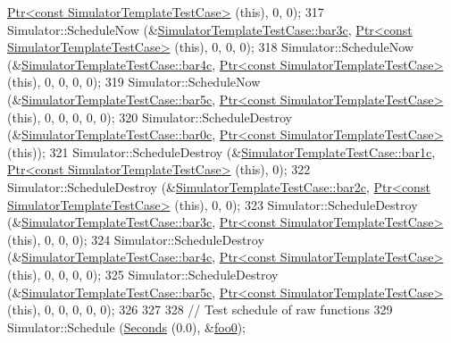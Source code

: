\begin{DoxyCode}
      \hyperlink{classns3_1_1Ptr}{Ptr<const SimulatorTemplateTestCase>} (\textcolor{keyword}{this}), 0, 0);
317   Simulator::ScheduleNow (&\hyperlink{classSimulatorTemplateTestCase_a3440409096aee7c6dda41caab7cceeb6}{SimulatorTemplateTestCase::bar3c}, 
      \hyperlink{classns3_1_1Ptr}{Ptr<const SimulatorTemplateTestCase>} (\textcolor{keyword}{this}), 0, 0, 0);
318   Simulator::ScheduleNow (&\hyperlink{classSimulatorTemplateTestCase_a4d7fde0e0f8f16201cb8731a65c84188}{SimulatorTemplateTestCase::bar4c}, 
      \hyperlink{classns3_1_1Ptr}{Ptr<const SimulatorTemplateTestCase>} (\textcolor{keyword}{this}), 0, 0, 0, 0);
319   Simulator::ScheduleNow (&\hyperlink{classSimulatorTemplateTestCase_af3908d1e88e554a76b7fcb7c6011182a}{SimulatorTemplateTestCase::bar5c}, 
      \hyperlink{classns3_1_1Ptr}{Ptr<const SimulatorTemplateTestCase>} (\textcolor{keyword}{this}), 0, 0, 0, 0, 0);
320   Simulator::ScheduleDestroy (&\hyperlink{classSimulatorTemplateTestCase_a39381dd6c298ce90120f9ca020b51a44}{SimulatorTemplateTestCase::bar0c}, 
      \hyperlink{classns3_1_1Ptr}{Ptr<const SimulatorTemplateTestCase>} (\textcolor{keyword}{this}));
321   Simulator::ScheduleDestroy (&\hyperlink{classSimulatorTemplateTestCase_a17a705290d33ff9d9752c5fcd3ca549a}{SimulatorTemplateTestCase::bar1c}, 
      \hyperlink{classns3_1_1Ptr}{Ptr<const SimulatorTemplateTestCase>} (\textcolor{keyword}{this}), 0);
322   Simulator::ScheduleDestroy (&\hyperlink{classSimulatorTemplateTestCase_a95e0f184170b9dd6ced11d3423752e9f}{SimulatorTemplateTestCase::bar2c}, 
      \hyperlink{classns3_1_1Ptr}{Ptr<const SimulatorTemplateTestCase>} (\textcolor{keyword}{this}), 0, 0);
323   Simulator::ScheduleDestroy (&\hyperlink{classSimulatorTemplateTestCase_a3440409096aee7c6dda41caab7cceeb6}{SimulatorTemplateTestCase::bar3c}, 
      \hyperlink{classns3_1_1Ptr}{Ptr<const SimulatorTemplateTestCase>} (\textcolor{keyword}{this}), 0, 0, 0);
324   Simulator::ScheduleDestroy (&\hyperlink{classSimulatorTemplateTestCase_a4d7fde0e0f8f16201cb8731a65c84188}{SimulatorTemplateTestCase::bar4c}, 
      \hyperlink{classns3_1_1Ptr}{Ptr<const SimulatorTemplateTestCase>} (\textcolor{keyword}{this}), 0, 0, 0, 0);
325   Simulator::ScheduleDestroy (&\hyperlink{classSimulatorTemplateTestCase_af3908d1e88e554a76b7fcb7c6011182a}{SimulatorTemplateTestCase::bar5c}, 
      \hyperlink{classns3_1_1Ptr}{Ptr<const SimulatorTemplateTestCase>} (\textcolor{keyword}{this}), 0, 0, 0, 0, 0);
326 
327 
328   \textcolor{comment}{// Test schedule of raw functions}
329   Simulator::Schedule (\hyperlink{group__timecivil_ga33c34b816f8ff6628e33d5c8e9713b9e}{Seconds} (0.0), &\hyperlink{simulator-test-suite_8cc_afdd6c8c1988df00d7e30a14f32f07845}{foo0});

\end{DoxyCode}
